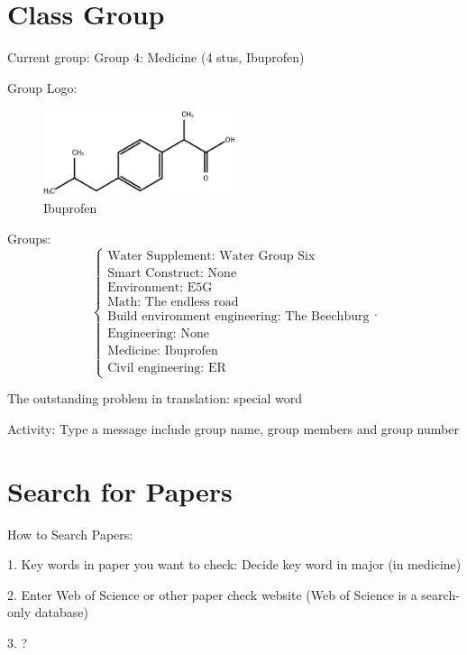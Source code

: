 \section{Class Group}%
\label{sec:Class Group}
Current group: Group 4: Medicine (4 stus, Ibuprofen)

Group Logo:
\begin{figure}[htpb]
    \centering
    \includegraphics[width=0.5\textwidth]{fig/Ibuprofen}
    \caption{Ibuprofen}
    \label{fig:Ibuprofen}
\end{figure}

Groups:
\[
    \begin{cases}
        \text{Water Supplement: Water Group Six}\\
        \text{Smart Construct: None}\\
        \text{Environment: E5G}\\
        \text{Math: The endless road}\\
        \text{Build environment engineering: The Beechburg}\\
        \text{Engineering: None}\\
        \text{Medicine: Ibuprofen}\\
        \text{Civil engineering: ER}
    \end{cases}
.\] 

The outstanding problem in translation: special word

Activity: Type a message include group name, group members and group number

\section{Search for Papers}%
\label{sec:Search for Papers}
How to Search Papers:

1. Key words in paper you want to check: Decide key word in major (in medicine)

2. Enter Web of Science or other paper check website (Web of Science is a search-only database)

3. ? 

